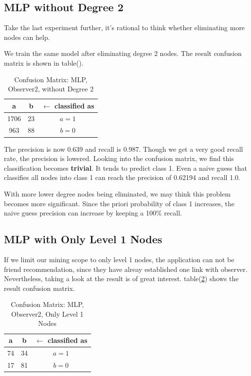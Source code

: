 \documentclass[11pt,a4paper]{article}
\begin{document}
\subsection{MLP without Degree 2}

Take the last experiment further, it's rational to 
think whether eliminating more nodes can help. 

We train the same model after eliminating degree 2 nodes. 
The result confusion matrix is shown in table().

\begin{table}[htb]
	\centering
	\caption{Confusion Matrix: MLP, Observer2, without Degree 2}
	\label{tbl:cm_o2_d2}
	\begin{tabular}{cc|c}
	\hline
a & b & \textbf{$\leftarrow$ classified as}\\	
	\hline
 1706 &23 &    $a = 1$\\
  963 &88 &    $b = 0$\\
	\hline
	\end{tabular}
\end{table}

The precision is now 0.639 and recall is 0.987. 
Though we get a very good recall rate, the precision 
is lowered. Looking into the confusion matrix, 
we find this classification becomes \textbf{trivial}. 
It tends to predict class 1. Even a naive guess 
that classifies all nodes into class 1 can reach 
the precision of 0.62194 and recall 1.0. 

With more lower degree nodes being eliminated, 
we may think this problem becomes more significant. 
Since the priori probability of class 1 increases, 
the naive guess precision can increase by keeping 
a 100\% recall. 

\subsection{MLP with Only Level 1 Nodes}

If we limit our mining scope to only level 1 nodes, 
the application can not be friend recommendation, since 
they have alreay established one link with observer. 
Nevertheless, taking a look at the result is of great interest. 
table(\ref{tbl:cm_o2_l1}) shows the result confusion matrix. 

\begin{table}[htb]
	\centering
	\caption{Confusion Matrix: MLP, Observer2, Only Level 1 Nodes}
	\label{tbl:cm_o2_l1}
	\begin{tabular}{cc|c}
	\hline
a & b & \textbf{$\leftarrow$ classified as}\\	
	\hline
 74 &34 &    $a = 1$\\
  17 &81 &    $b = 0$\\
	\hline
	\end{tabular}
\end{table}
\end{document}
